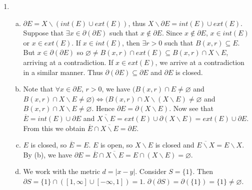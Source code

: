 \documentclass[A4paper,12pt]{article}
\theoremstyle{definition}
\numberwithin{equation}{section}
\begin{document}
\begin{enumerate}[(1)]
        \item
            \begin{enumerate}[(a)]
                \item
                    $\partial E = X \backslash (int(E) \cup ext(E))$, thus $X \backslash \partial E = int(E) \cup ext(E)$.
                    Suppose that $\exists x \in \partial(\partial E)$ such that $x \not \in \partial E$. 
                    Since $x \not \in \partial E$, $x \in int(E)$ or $x \in ext(E)$.
                    If $x \in int(E)$, then $\exists r>0$ such that $B(x, r) \subseteq E$. 
                    But $x \in \partial(\partial E)$ so $\varnothing \neq B(x,r) \cap ext(E) \subseteq B(x, r) \cap X\backslash E$, arriving at a contradiction.
                    If $x \in ext(E)$, we arrive at a contradiction in a similar manner.
                    Thus $\partial(\partial E) \subseteq \partial E$ and $\partial E$ is closed.
                \item
                    Note that $\forall x \in \partial E$, $r>0$, we have $(B(x, r) \cap E \not = \varnothing$ and $B(x, r) \cap X\backslash E \not = \varnothing) \iff (B(x, r) \cap X\backslash (X \backslash E) \not = \varnothing$ and $B(x, r) \cap X \backslash E \not = \varnothing$.
                    Hence $\partial E = \partial (X\backslash E)$.
                    Now see that $\overline{E} = int(E) \cup \partial E$ and $\overline{X\backslash E} = ext(E) \cup \partial (X \backslash E) = ext(E) \cup \partial E$. From this we obtain $\overline{E} \cap \overline{X\backslash E} = \partial E$.
                \item
                    $E$ is closed, so $\overline{E} = E$. $E$ is open, so $X \backslash E$ is closed and $\overline{E\backslash X} = E\backslash X$.
                    By (b), we have $\partial E = \overline{E} \cap \overline{X\backslash E} = E \cap (X\backslash E) = \varnothing$.
                \item
                    We work with the metric $d = |x-y|$.   
                    Consider $S = \{1\}$. Then $\partial S = \{1\} \cap ([1, \infty] \cup [-\infty, 1]) = 1$. $\partial (\partial S) = \partial(\{1\}) = \{1\} \neq \varnothing$.
            \end{enumerate}


\end{enumerate}
\end{document}
